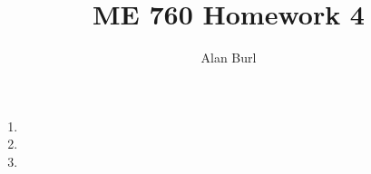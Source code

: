 \documentclass[12pt]{article}
\author{Alan Burl}
\title{ME 760 Homework 4}
\begin{document}
\maketitle
\clearpage
\begin{enumerate}
	\item \clearpage %
	\item \clearpage %
	\item \clearpage  


\end{enumerate}
\clearpage
\end{document}
